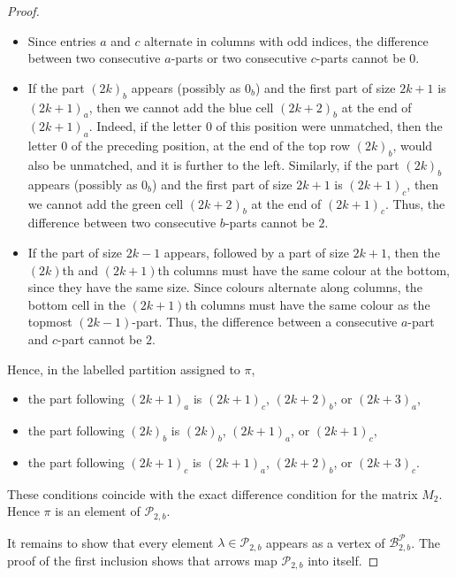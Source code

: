 \documentclass[11pt]{article}
\theoremstyle{definition}
\theoremstyle{remark}
\theoremstyle{definition}
\numberwithin{equation}{section}
\begin{document}
\begin{proof}
\begin{itemize}
\item Since entries $a$ and $c$ alternate in columns with odd indices, the difference between two consecutive $a$-parts or two consecutive $c$-parts cannot be $0$. 
\item If the part $(2k)_b$ appears (possibly as $0_b$) and the first part of size $2k+1$ is $(2k+1)_a$, then we cannot add the blue cell $(2k+2)_b$ at the end of $(2k+1)_a$. Indeed, if the letter $0$ of this position were unmatched, then the letter $0$ of the preceding position, at the end of the top row $(2k)_b$, would also be unmatched, and it is further to the left. Similarly, if the part $(2k)_b$ appears (possibly as $0_b$) and the first part of size $2k+1$ is $(2k+1)_c$, then we cannot add the green cell $(2k+2)_b$ at the end of $(2k+1)_c$. Thus, the difference between two consecutive $b$-parts cannot be $2$.
\item If the part of size $2k-1$ appears, followed by a part of size $2k+1$, then the $(2k)$th and $(2k+1)$th columns must have the same colour at the bottom, since they have the same size. Since colours alternate along columns, the bottom cell in the $(2k+1)$th columns must have the same colour as the topmost $(2k-1)$-part. Thus, the difference between a consecutive $a$-part and $c$-part cannot be $2$.
\end{itemize}
  
Hence, in the labelled partition assigned to \( \pi \),
\begin{itemize}
\item the part following \( (2k+1)_a \) is \( (2k+1)_c \), \( (2k+2)_b \), or \( (2k+3)_a \),
\item the part following \( (2k)_b \) is \( (2k)_b \), \( (2k+1)_a \), or \( (2k+1)_c \),
\item the part following \( (2k+1)_c \) is \( (2k+1)_a \), \( (2k+2)_b \), or \( (2k+3)_c \).
\end{itemize}
These conditions coincide with the exact difference condition for
the matrix \( M_2 \). Hence \( \pi \) is an element of
\( \mathcal{P}_{2,b} \).

It remains to show that every element \(\lambda \in \mathcal{P}_{2,b}\) appears as a vertex of \(\mathcal{B}_{2,b}^{\mathcal{P}}\). The proof of the first inclusion shows that arrows map $\mathcal{P}_{2,b}$ into itself.


\end{proof}
\end{document}
